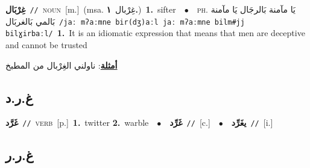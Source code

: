 \documentclass[10pt,a4paper,twoside]{article} %
\begin{document}
\begin{multicols}{2}
{\setlength\topsep{0pt}\textbf{\foreignlanguage{arabic}{غِرْبَال}}\ {\color{gray}\texttt{//}\color{black}}\ \textsc{noun}\ [m.]\ \color{gray}(msa. \foreignlanguage{arabic}{غِرْبال}~\foreignlanguage{arabic}{\textbf{١.}})\color{black}\ \textbf{1.}~sifter\ \ $\bullet$\ \ \textsc{ph.} \color{gray} \foreignlanguage{arabic}{يَا مآمنة بَالرجَال يَا مآمنة بَالمي بَالغربَال}\color{black}\ {\color{gray}\texttt{/{\sffamily jaː mʔaːmne bir(dʒ)aːl jaː mʔaːmne bilm\#jj bilɣirbaːl}/}\color{black}}\ \textbf{1.}~It is an idiomatic expression that means that men are deceptive and cannot be trusted\  \begin{flushright}\color{gray}\foreignlanguage{arabic}{\textbf{\underline{\foreignlanguage{arabic}{أمثلة}}}: ناولني الغِرْبال من المطبخ}\end{flushright}\color{black}} \vspace{2mm}

\vspace{-3mm}
\subsection*{\color{blue}\foreignlanguage{arabic}{غ.ر.د}\color{blue}{}} 

{\setlength\topsep{0pt}\textbf{\foreignlanguage{arabic}{غَرَّد}}\ {\color{gray}\texttt{//}\color{black}}\ \textsc{verb}\ [p.]\ \textbf{1.}~twitter  \textbf{2.}~warble\ \ $\bullet$\ \ \setlength\topsep{0pt}\textbf{\foreignlanguage{arabic}{غَرِّد}}\ {\color{gray}\texttt{//}\color{black}}\ [c.]\ \ $\bullet$\ \ \setlength\topsep{0pt}\textbf{\foreignlanguage{arabic}{يغَرِّد}}\ {\color{gray}\texttt{//}\color{black}}\ [i.]\ } \vspace{2mm}

\vspace{-3mm}
\subsection*{\color{blue}\foreignlanguage{arabic}{غ.ر.ر}\color{blue}{}} 


\end{multicols}
\end{document}
